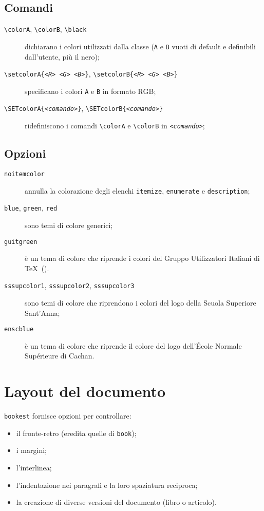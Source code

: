 \documentclass[a4paper,oneside,centered,noparindent,noparskip]{bookest}
\begin{document}
\subsection{Comandi}\label{coloricomandi}
\begin{description}
 \item[\texttt{\textbackslash colorA}, \texttt{\textbackslash colorB}, \texttt{\textbackslash black}] dichiarano i colori utilizzati dalla classe (\texttt{A} e \texttt{B} vuoti di default e definibili dall'utente, più il nero);
 \item[\texttt{\textbackslash setcolorA\{\textit{<R> <G> <B>}\}}, \texttt{\textbackslash setcolorB\{\textit{<R> <G> <B>}\}}] specificano i colori \texttt{A} e \texttt{B} in formato RGB;
 \item[\texttt{\textbackslash SETcolorA\{\textit{<comando>}\}}, \texttt{\textbackslash SETcolorB\{\textit{<comando>}\}}] ridefiniscono i comandi \texttt{\textbackslash colorA} e \texttt{\textbackslash colorB} in \texttt{\textit{<comando>}};
\end{description}

\subsection{Opzioni}\label{coloriopzioni}
\begin{description}
 \item[\texttt{noitemcolor}] annulla la colorazione degli elenchi \texttt{itemize}, \texttt{enumerate} e \texttt{description};
\end{description}
\ppar
\begin{description}
 \item[\texttt{blue}, \texttt{green}, \texttt{red}] sono temi di colore generici;
 \item[\texttt{guitgreen}] è un tema di colore che riprende i colori del Gruppo Utilizzatori Italiani di \TeX\ (\GuIT).
 \item[\texttt{sssupcolor1}, \texttt{sssupcolor2}, \texttt{sssupcolor3}] sono temi di colore che riprendono i colori del logo della Scuola Superiore Sant'Anna;
 \item[\texttt{enscblue}] è un tema di colore che riprende il colore del logo dell'École Normale Supérieure di Cachan.
\end{description}

\section{Layout del documento}
\texttt{bookest} fornisce opzioni per controllare:
\begin{itemize}
 \item il fronte-retro (eredita quelle di \texttt{book});
 \item i margini;
 \item l'interlinea;
 \item l'indentazione nei paragrafi e la loro spaziatura reciproca;
 \item la creazione di diverse versioni del documento (libro o articolo).
\end{itemize}
\end{document}
